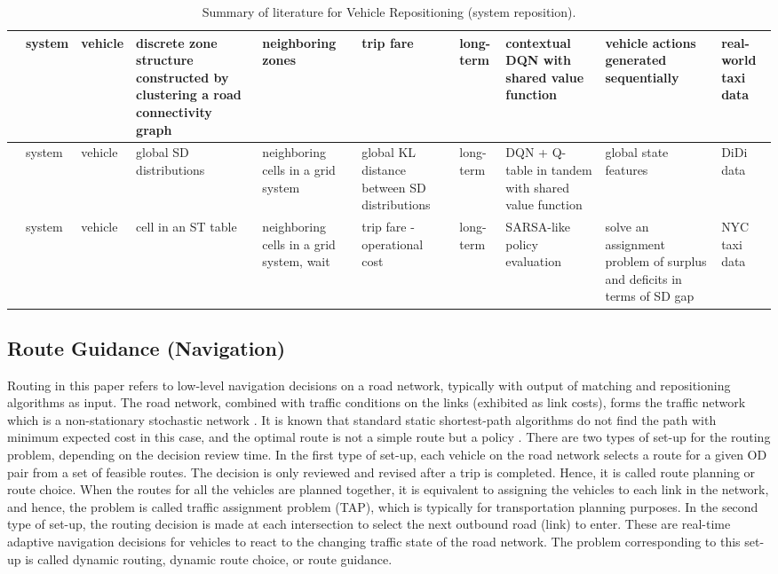 \documentclass{article}
\begin{document}
\begin{table}
\begin{tabular}{||p{}|p{}|p{}|p{}|p{}|p{}|p{}|p{}|p{}|p{}||}
\hline
\cite{liu2020context} & system & vehicle & discrete zone structure constructed by clustering a road connectivity graph & neighboring zones & trip fare & long-term & contextual DQN with shared value function & vehicle actions generated sequentially & real-world taxi data \\
\hline
\cite{zhang2020dynamic} & system & vehicle & global SD distributions & neighboring cells in a grid system & global KL distance between SD distributions & long-term & DQN + Q-table in tandem with shared value function & global state features & DiDi data \\
\hline
\cite{chaudhari2020learn} & system & vehicle & cell in an ST table & neighboring cells in a grid system, wait & trip fare - operational cost & long-term & SARSA-like policy evaluation & solve an assignment problem of surplus and deficits in terms of SD gap & NYC taxi data \\
\hline
\hline
\end{tabular}
\caption{Summary of literature for Vehicle Repositioning (system reposition).}
\label{tab:ref_reposition_sys}
\end{table}



\subsection{Route Guidance (Navigation)}
Routing in this paper refers to low-level navigation decisions on a road network, typically with output of matching and repositioning algorithms as input. The road network, combined with traffic conditions on the links (exhibited as link costs), forms the traffic network which is a non-stationary stochastic network \citep{mao2018reinforcement}. It is known that standard static shortest-path algorithms do not find the path with minimum expected cost in this case, and the optimal route is not a simple route but a policy \citep{hall1986fastest,kim2005optimal}. There are two types of set-up for the routing problem, depending on the decision review time. In the first type of set-up, each vehicle on the road network selects a route for a given OD pair from a set of feasible routes. The decision is only reviewed and revised after a trip is completed. Hence, it is called route planning or route choice. When the routes for all the vehicles are planned together, it is equivalent to assigning the vehicles to each link in the network, and hence, the problem is called traffic assignment problem (TAP), which is typically for transportation planning purposes. In the second type of set-up, the routing decision is made at each intersection to select the next outbound road (link) to enter. These are real-time adaptive navigation decisions for vehicles to react to the changing traffic state of the road network. The problem corresponding to this set-up is called dynamic routing, dynamic route choice, or route guidance.
\end{document}
